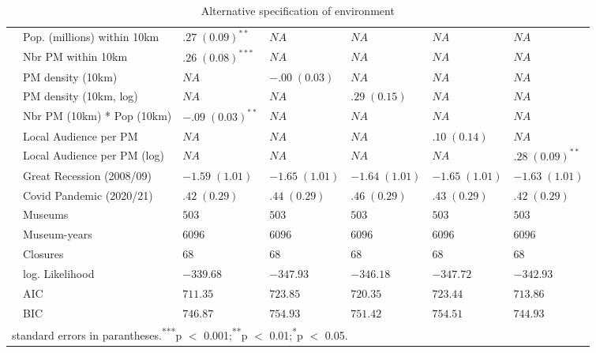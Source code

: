 \documentclass[12pt]{article}
\begin{document}
\begin{landscape}
\begin{table}[ht]
\begin{tabular}{p{0mm}llllll}
   & Pop. (millions) within 10km & $.27 \; (0.09)^{**}$ & $NA$ & $NA$ & $NA$ & $NA$ \\ 
   & Nbr PM within 10km & $.26 \; (0.08)^{***}$ & $NA$ & $NA$ & $NA$ & $NA$ \\ 
   & PM density (10km) & $NA$ & $-.00 \; (0.03)$ & $NA$ & $NA$ & $NA$ \\ 
   & PM density (10km, log) & $NA$ & $NA$ & $.29 \; (0.15)$ & $NA$ & $NA$ \\ 
   & Nbr PM (10km) * Pop (10km) & $-.09 \; (0.03)^{**}$ & $NA$ & $NA$ & $NA$ & $NA$ \\ 
   & Local Audience per PM & $NA$ & $NA$ & $NA$ & $.10 \; (0.14)$ & $NA$ \\ 
   & Local Audience per PM (log) & $NA$ & $NA$ & $NA$ & $NA$ & $.28 \; (0.09)^{**}$ \\ 
   & Great Recession (2008/09) & $-1.59 \; (1.01)$ & $-1.65 \; (1.01)$ & $-1.64 \; (1.01)$ & $-1.65 \; (1.01)$ & $-1.63 \; (1.01)$ \\ 
   & Covid Pandemic (2020/21) & $.42 \; (0.29)$ & $.44 \; (0.29)$ & $.46 \; (0.29)$ & $.43 \; (0.29)$ & $.42 \; (0.29)$ \\ 
   \hline
 & Museums & $503$ & $503$ & $503$ & $503$ & $503$ \\ 
   & Museum-years & $6096$ & $6096$ & $6096$ & $6096$ & $6096$ \\ 
   & Closures & $68$ & $68$ & $68$ & $68$ & $68$ \\ 
   & log. Likelihood & $-339.68$ & $-347.93$ & $-346.18$ & $-347.72$ & $-342.93$ \\ 
   & AIC & $711.35$ & $723.85$ & $720.35$ & $723.44$ & $713.86$ \\ 
   & BIC & $746.87$ & $754.93$ & $751.42$ & $754.51$ & $744.93$ \\ 
   \hline 
 \multicolumn{7}{l}{\footnotesize{standard errors in parantheses.\textsuperscript{***}p $<$ 0.001;\textsuperscript{**}p $<$ 0.01;\textsuperscript{*}p $<$ 0.05.}}
\end{tabular}
\caption{Alternative specification of environment} 
\label{tbl:t_reg_coxph_env}
\end{table}
\end{landscape}
\end{document}
